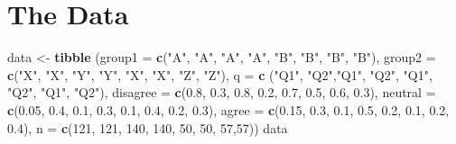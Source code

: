 \documentclass[
]{book}
\newenvironment{Shaded}{\begin{snugshade}}{\end{snugshade}}
\newcommand{\DataTypeTok}[1]{\textcolor[rgb]{0.13,0.29,0.53}{#1}}
\newcommand{\DecValTok}[1]{\textcolor[rgb]{0.00,0.00,0.81}{#1}}
\newcommand{\FloatTok}[1]{\textcolor[rgb]{0.00,0.00,0.81}{#1}}
\newcommand{\KeywordTok}[1]{\textcolor[rgb]{0.13,0.29,0.53}{\textbf{#1}}}
\newcommand{\NormalTok}[1]{#1}
\newcommand{\StringTok}[1]{\textcolor[rgb]{0.31,0.60,0.02}{#1}}
\begin{document}
\hypertarget{the-data}{%
\section{The Data}\label{the-data}}

\begin{Shaded}
\begin{Highlighting}[]
\NormalTok{data <-}\StringTok{ }\KeywordTok{tibble}\NormalTok{ (}\DataTypeTok{group1 =} \KeywordTok{c}\NormalTok{(}\StringTok{"A"}\NormalTok{, }\StringTok{"A"}\NormalTok{, }\StringTok{"A"}\NormalTok{, }\StringTok{"A"}\NormalTok{, }\StringTok{"B"}\NormalTok{, }\StringTok{"B"}\NormalTok{, }\StringTok{"B"}\NormalTok{, }\StringTok{"B"}\NormalTok{),}
                \DataTypeTok{group2 =} \KeywordTok{c}\NormalTok{(}\StringTok{"X"}\NormalTok{, }\StringTok{"X"}\NormalTok{, }\StringTok{"Y"}\NormalTok{, }\StringTok{"Y"}\NormalTok{, }\StringTok{"X"}\NormalTok{, }\StringTok{"X"}\NormalTok{, }\StringTok{"Z"}\NormalTok{, }\StringTok{"Z"}\NormalTok{),}
                \DataTypeTok{q =} \KeywordTok{c}\NormalTok{ (}\StringTok{"Q1"}\NormalTok{, }\StringTok{"Q2"}\NormalTok{,}\StringTok{"Q1"}\NormalTok{, }\StringTok{"Q2"}\NormalTok{, }\StringTok{"Q1"}\NormalTok{, }\StringTok{"Q2"}\NormalTok{, }\StringTok{"Q1"}\NormalTok{, }\StringTok{"Q2"}\NormalTok{),}
                \DataTypeTok{disagree =} \KeywordTok{c}\NormalTok{(}\FloatTok{0.8}\NormalTok{, }\FloatTok{0.3}\NormalTok{, }\FloatTok{0.8}\NormalTok{, }\FloatTok{0.2}\NormalTok{, }\FloatTok{0.7}\NormalTok{, }\FloatTok{0.5}\NormalTok{, }\FloatTok{0.6}\NormalTok{, }\FloatTok{0.3}\NormalTok{),}
                \DataTypeTok{neutral =} \KeywordTok{c}\NormalTok{(}\FloatTok{0.05}\NormalTok{, }\FloatTok{0.4}\NormalTok{, }\FloatTok{0.1}\NormalTok{, }\FloatTok{0.3}\NormalTok{, }\FloatTok{0.1}\NormalTok{, }\FloatTok{0.4}\NormalTok{, }\FloatTok{0.2}\NormalTok{, }\FloatTok{0.3}\NormalTok{),}
                \DataTypeTok{agree =} \KeywordTok{c}\NormalTok{(}\FloatTok{0.15}\NormalTok{, }\FloatTok{0.3}\NormalTok{, }\FloatTok{0.1}\NormalTok{, }\FloatTok{0.5}\NormalTok{, }\FloatTok{0.2}\NormalTok{, }\FloatTok{0.1}\NormalTok{, }\FloatTok{0.2}\NormalTok{, }\FloatTok{0.4}\NormalTok{),}
                \DataTypeTok{n =} \KeywordTok{c}\NormalTok{(}\DecValTok{121}\NormalTok{, }\DecValTok{121}\NormalTok{, }\DecValTok{140}\NormalTok{, }\DecValTok{140}\NormalTok{, }\DecValTok{50}\NormalTok{, }\DecValTok{50}\NormalTok{, }\DecValTok{57}\NormalTok{,}\DecValTok{57}\NormalTok{)) }
\NormalTok{data}
\end{Highlighting}
\end{Shaded}
\end{document}
